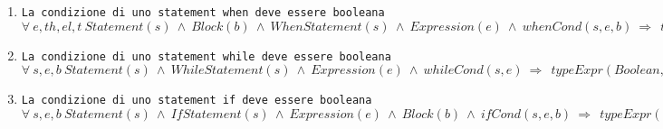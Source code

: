 
\begin{enumerate}
	\item \texttt{La condizione di uno statement when deve essere booleana} \\
		  $\forall \ e,th,el,t \ Statement(s) \ \land \ Block(b) \ \land \ WhenStatement(s) \ \land \ Expression(e) \ \land \ whenCond(s, e, b) \ \Rightarrow \ \ typeExpr(Boolean, e)$ \\ 
	\item \texttt{La condizione di uno statement while deve essere booleana} \\
		  $\forall \ s,e,b \ Statement(s) \ \land \ WhileStatement(s) \ \land \ Expression(e) \ \land \ whileCond(s, e) \ \Rightarrow \ \ typeExpr(Boolean, e)$ \\
	\item \texttt{La condizione di uno statement if deve essere booleana} \\
		  $\forall \ s,e,b \ Statement(s) \ \land \ IfStatement(s) \ \land \ Expression(e) \ \land \ Block(b) \ \land \ ifCond(s, e, b) \ \Rightarrow \ \ typeExpr(Boolean, e)$ \\ 
\end{enumerate}